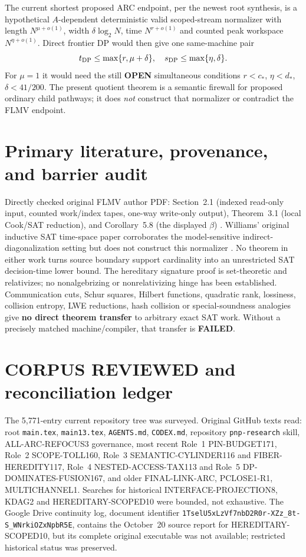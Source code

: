 \documentclass[11pt]{article}
\newcommand{\OPEN}{\textbf{OPEN}}
\begin{document}
The current shortest proposed ARC endpoint,
per the newest root synthesis, is a
hypothetical $A$-dependent deterministic
valid scoped-stream normalizer with
length $N^{\mu+o(1)}$, width
$\delta\log_2N$, time $N^{r+o(1)}$
and counted peak workspace $N^{\eta+o(1)}$.
Direct frontier DP would then give one
same-machine pair
\[
 t_{\rm DP}\le\max\{r,\mu+\delta\},\quad
 s_{\rm DP}\le\max\{\eta,\delta\}.
\]
For $\mu=1$ it would need the still
\OPEN{} simultaneous conditions
$r<c_*$, $\eta<d_*$, $\delta<41/200$.
The present quotient theorem is a
semantic firewall for proposed ordinary
child pathways; it does \emph{not}
construct that normalizer or contradict
the FLMV endpoint.

\section{Primary literature, provenance, and barrier audit}
Directly checked original FLMV author PDF:
Section~2.1 (indexed read-only input,
counted work/index tapes, one-way
write-only output), Theorem~3.1
(local Cook/SAT reduction), and
Corollary~5.8 (the displayed $\beta$)
\cite{flmv}. Williams' original inductive
SAT time-space paper corroborates the
model-sensitive indirect-diagonalization
setting but does not construct this
normalizer \cite{williams}.
No theorem in either work turns source
boundary support cardinality into an
unrestricted SAT decision-time lower bound.
The hereditary signature proof is
set-theoretic and relativizes; no
nonalgebrizing or nonrelativizing hinge
has been established. Communication
cuts, Schur squares, Hilbert functions,
quadratic rank, lossiness, collision
entropy, LWE reductions, hash collision
or special-soundness analogies give
\textbf{no direct theorem transfer}
to arbitrary exact SAT work. Without
a precisely matched machine/compiler,
that transfer is \textbf{FAILED}.

\section{CORPUS REVIEWED and reconciliation ledger}
The 5,771-entry current repository tree
was surveyed. Original GitHub texts read:
root \texttt{main.tex}, \texttt{main13.tex},
\texttt{AGENTS.md}, \texttt{CODEX.md},
repository \texttt{pnp-research} skill,
ALL-ARC-REFOCUS3 governance, most recent
Role~1 PIN-BUDGET171, Role~2
SCOPE-TOLL160, Role~3
SEMANTIC-CYLINDER116 and
FIBER-HEREDITY117, Role~4
NESTED-ACCESS-TAX113 and Role~5
DP-DOMINATES-FUSION167, and older
FINAL-LINK-ARC, PCLOSE1-R1,
MULTICHANNEL1. Searches for historical
INTERFACE-PROJECTION8, KDAG2
and HEREDITARY-SCOPED10 were bounded,
not exhaustive. The Google Drive
continuity log, document identifier
\texttt{1TselU5xLzVf7nbD2R0r-XZz\_8t-S\_WNrkiOZxNpbR5E},
contains the October~20 source
report for HEREDITARY-SCOPED10,
but its complete original executable
was not available; restricted
historical status was preserved.
\end{document}
